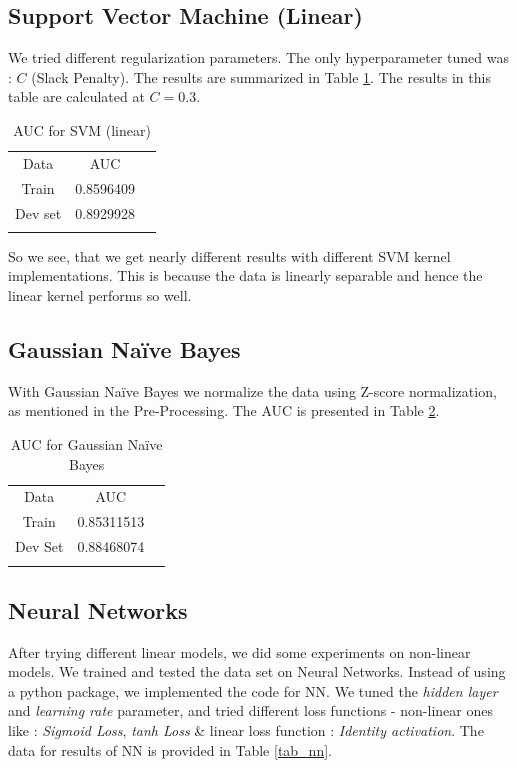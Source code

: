 \documentclass[conference]{IEEEtran}
\numberwithin{equation}{section}
\numberwithin{figure}{section}
\numberwithin{table}{section}
\begin{document}
\subsection{Support Vector Machine (Linear)}
We tried different regularization parameters. The only hyperparameter tuned was : \textit{$C$} (Slack Penalty). The results are summarized in Table \ref{tab_svm}.  The results in this table are calculated at $C = 0.3$.

\begin{table}[!htb]
 \centering
 \caption{AUC for SVM (linear)}
 \label{tab_svm}
\begin{tabular}{ c c c } 
	    \noalign{\smallskip}\hline\noalign{\smallskip}
		Data &   AUC \\
    	   \noalign{\smallskip}\hline\noalign{\smallskip}
		Train & 0.8596409\\
		Dev set & 0.8929928\\
			    \noalign{\smallskip}\hline\noalign{\smallskip}
  \end{tabular} 
\end{table}

So we see, that we get nearly different results with different SVM kernel implementations. This is because the data is linearly separable and hence the linear kernel performs so well.

\subsection{Gaussian Na{\"i}ve Bayes}
With Gaussian Na{\"i}ve Bayes we normalize the data using Z-score normalization, as mentioned in the Pre-Processing. The AUC is presented in Table \ref{nb_tab}.

\begin{table}[!htb]
 \centering
 \caption{AUC for Gaussian Na{\"i}ve Bayes}
 \label{nb_tab}
\begin{tabular}{ c c c } 
	    \noalign{\smallskip}\hline\noalign{\smallskip}
		Data & AUC \\
    	   \noalign{\smallskip}\hline\noalign{\smallskip}
		Train &  0.85311513\\
		Dev Set & 0.88468074\\
		\noalign{\smallskip}\hline\noalign{\smallskip}
  \end{tabular} 
\end{table}

\subsection{Neural Networks}
After trying different linear models, we did some experiments on non-linear models. We trained and tested the data set on Neural Networks. Instead of using a python package, we implemented the code for NN. We tuned the \textit{hidden layer} and \textit{learning rate} parameter,  and tried different loss functions - non-linear ones like :  \textit{Sigmoid Loss}, \textit{tanh Loss} \& linear loss function : \textit{Identity activation}. The data for results of NN is provided in Table \ref{tab_nn}.
\end{document}
